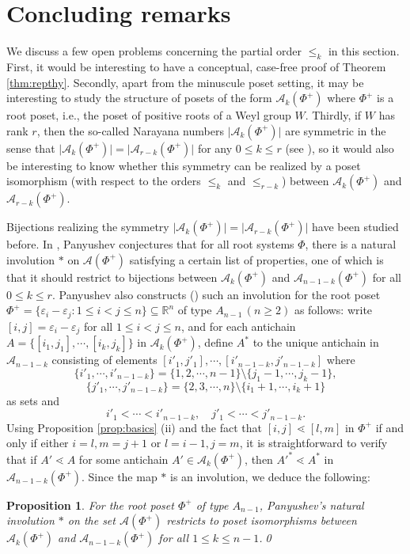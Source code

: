 \documentclass[11pt]{amsart}
\theoremstyle{plain}
\newtheorem{proposition}[theorem]{Proposition}
\theoremstyle{definition}
\theoremstyle{remark}
\numberwithin{equation}{section}
\newcommand{\R}{{\mathbb R}}
\newcommand{\cala}{\mathcal{A}}
\newcommand{\abs}[1]{\lvert #1 \rvert}
\begin{document}
\section{Concluding remarks}
\label{sec:conclude}

We discuss a few open problems concerning the partial order $\le_k$ in this
section. First, it would be interesting to have a conceptual, case-free proof
of Theorem \ref{thm:repthy}.  Secondly, apart from the minuscule poset setting,
it may be interesting to study the structure of posets of the form
$\cala_k(\Phi^+)$ where $\Phi^+$ is a root poset, i.e., the poset of positive
roots of a Weyl group $W$. Thirdly, if $W$ has rank $r$, then the so-called
Narayana numbers $\abs{\cala_k(\Phi^+)}$ are symmetric in the sense that
$\abs{\cala_k(\Phi^+)}=\abs{\cala_{r-k}(\Phi^+)}$ for any $0\le k\le r$ (see
\cite{DefantHopkins}), so it would also be interesting to know whether this
symmetry can be realized by a poset isomorphism (with respect to the orders
$\le_k$ and $\le_{r-k}$) between $\cala_k(\Phi^+)$ and $\cala_{r-k}(\Phi^+)$.

Bijections realizing the symmetry
$\abs{\cala_k(\Phi^+)}=\abs{\cala_{r-k}(\Phi^+)}$ have been studied before.  In
\cite[Conjecture 6.1]{Panyushev}, Panyushev conjectures that for all root
systems $\Phi$, there is a natural involution $*$ on $\cala(\Phi^+)$ satisfying
a certain list of properties, one of which is that it should restrict to
bijections between $\cala_k(\Phi^+)$ and $\cala_{n-1-k}(\Phi^+)$ for all $0\le
k\le r$. Panyushev also constructs (\cite[Section 4]{Panyushev}) such an
involution for the root poset $\Phi^+=\{\varepsilon_i-\varepsilon_j: 1\le i<j\le
n\}\subseteq \R^n$ of type $A_{n-1}\, (n\ge 2)$ as follows: write
$[i,j]=\varepsilon_i-\varepsilon_j$ for all $1\le i<j\le n$, and for each antichain
$A=\{[i_1,j_1],\cdots, [i_k,j_k]\}$ in $\cala_k(\Phi^+)$, define $A^*$ to the
unique antichain in $\cala_{n-1-k}$ consisting of elements $[i'_1,j'_1], \cdots,
[i'_{n-1-k}, j'_{n-1-k}]$ where \[ \{i'_1,\cdots,
i'_{n-1-k}\}=\{1,2,\cdots,n-1\}\setminus\{j_1-1,\cdots, j_k-1\},\]
\[\{j'_1,\cdots, j'_{n-1-k}\}=\{2,3,\cdots,n\}\setminus\{i_1+1,\cdots,i_k+1\} \]
as sets and \[ i'_1<\cdots< i'_{n-1-k},\quad j'_1<\cdots< j'_{n-1-k}.  \] Using
Proposition \ref{prop:basics} (ii) and the fact that $[i,j]\lessdot [l,m]$ in
$\Phi^+$ if and only if either $i=l, m=j+1$ or $l=i-1, j=m$, it is
straightforward to verify that if $A'\lessdot A$ for some antichain $A'\in
\cala_k(\Phi^+)$, then $A'^*\lessdot A^*$ in $\cala_{n-1-k}(\Phi^+)$. Since the
map $*$  is an involution, we deduce the following: 
\begin{proposition} 
    \label{prop:panyu} For the root poset $\Phi^+$ of type $A_{n-1}$,
      Panyushev's natural involution $*$ on the set $\cala(\Phi^+)$ restricts to
      poset isomorphisms between $\cala_k(\Phi^+)$ and $\cala_{n-1-k}(\Phi^+)$
      for all $1\le k\le n-1$.\qed
\end{proposition} 
\end{document}
